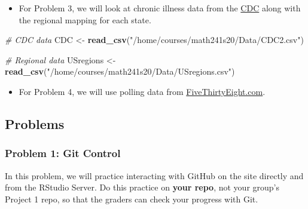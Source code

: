 \documentclass[]{article}
\newenvironment{Shaded}{\begin{snugshade}}{\end{snugshade}}
\newcommand{\KeywordTok}[1]{\textcolor[rgb]{0.13,0.29,0.53}{\textbf{#1}}}
\newcommand{\StringTok}[1]{\textcolor[rgb]{0.31,0.60,0.02}{#1}}
\newcommand{\CommentTok}[1]{\textcolor[rgb]{0.56,0.35,0.01}{\textit{#1}}}
\newcommand{\OperatorTok}[1]{\textcolor[rgb]{0.81,0.36,0.00}{\textbf{#1}}}
\newcommand{\NormalTok}[1]{#1}
\providecommand{\tightlist}{%
  \setlength{\itemsep}{0pt}\setlength{\parskip}{0pt}}
\begin{document}
\begin{itemize}
\tightlist
\item
  For Problem 3, we will look at chronic illness data from the
  \href{https://www.cdc.gov/cdi/index.html}{CDC} along with the regional
  mapping for each state.
\end{itemize}

\begin{Shaded}
\begin{Highlighting}[]
\CommentTok{# CDC data}
\NormalTok{CDC <-}\StringTok{ }\KeywordTok{read_csv}\NormalTok{(}\StringTok{"/home/courses/math241s20/Data/CDC2.csv"}\NormalTok{)}

\CommentTok{# Regional data}
\NormalTok{USregions <-}\StringTok{ }\KeywordTok{read_csv}\NormalTok{(}\StringTok{"/home/courses/math241s20/Data/USregions.csv"}\NormalTok{)}
\end{Highlighting}
\end{Shaded}

\begin{itemize}
\tightlist
\item
  For Problem 4, we will use polling data from
  \href{https://projects.fivethirtyeight.com/congress-generic-ballot-polls/}{FiveThirtyEight.com}.
\end{itemize}

\begin{Shaded}
\end{Shaded}

\subsection{Problems}\label{problems}

\subsubsection{Problem 1: Git Control}\label{problem-1-git-control}

In this problem, we will practice interacting with GitHub on the site
directly and from the RStudio Server. Do this practice on \textbf{your
repo}, not your group's Project 1 repo, so that the graders can check
your progress with Git.
\end{document}
